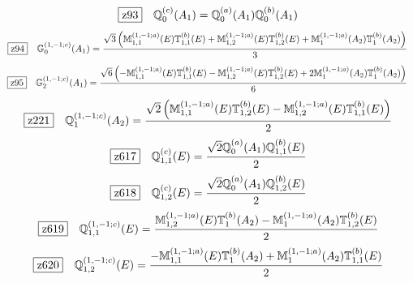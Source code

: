 \documentclass[fleqn,10pt,landscape]{jsarticle}
\begin{document}
\begin{dmath*}
\hspace*{3mm}\fbox{z93}\quad \mathbb{Q}_{0}^{(c)}(A_{1})=\mathbb{Q}_{0}^{(a)}(A_{1}) \mathbb{Q}_{0}^{(b)}(A_{1})
\end{dmath*}
\begin{dmath*}
\hspace*{3mm}\fbox{z94}\quad \mathbb{G}_{0}^{(1,-1;c)}(A_{1})=\frac{\sqrt{3} \left(\mathbb{M}_{1,1}^{(1,-1;a)}(E) \mathbb{T}_{1,1}^{(b)}(E) + \mathbb{M}_{1,2}^{(1,-1;a)}(E) \mathbb{T}_{1,2}^{(b)}(E) + \mathbb{M}_{1}^{(1,-1;a)}(A_{2}) \mathbb{T}_{1}^{(b)}(A_{2})\right)}{3}
\end{dmath*}
\begin{dmath*}
\hspace*{3mm}\fbox{z95}\quad \mathbb{G}_{2}^{(1,-1;c)}(A_{1})=\frac{\sqrt{6} \left(- \mathbb{M}_{1,1}^{(1,-1;a)}(E) \mathbb{T}_{1,1}^{(b)}(E) - \mathbb{M}_{1,2}^{(1,-1;a)}(E) \mathbb{T}_{1,2}^{(b)}(E) + 2 \mathbb{M}_{1}^{(1,-1;a)}(A_{2}) \mathbb{T}_{1}^{(b)}(A_{2})\right)}{6}
\end{dmath*}
\begin{dmath*}
\hspace*{3mm}\fbox{z221}\quad \mathbb{Q}_{1}^{(1,-1;c)}(A_{2})=\frac{\sqrt{2} \left(\mathbb{M}_{1,1}^{(1,-1;a)}(E) \mathbb{T}_{1,2}^{(b)}(E) - \mathbb{M}_{1,2}^{(1,-1;a)}(E) \mathbb{T}_{1,1}^{(b)}(E)\right)}{2}
\end{dmath*}
\begin{dmath*}
\hspace*{3mm}\fbox{z617}\quad \mathbb{Q}_{1,1}^{(c)}(E)=\frac{\sqrt{2} \mathbb{Q}_{0}^{(a)}(A_{1}) \mathbb{Q}_{1,1}^{(b)}(E)}{2}
\end{dmath*}
\begin{dmath*}
\hspace*{3mm}\fbox{z618}\quad \mathbb{Q}_{1,2}^{(c)}(E)=\frac{\sqrt{2} \mathbb{Q}_{0}^{(a)}(A_{1}) \mathbb{Q}_{1,2}^{(b)}(E)}{2}
\end{dmath*}
\begin{dmath*}
\hspace*{3mm}\fbox{z619}\quad \mathbb{Q}_{1,1}^{(1,-1;c)}(E)=\frac{\mathbb{M}_{1,2}^{(1,-1;a)}(E) \mathbb{T}_{1}^{(b)}(A_{2}) - \mathbb{M}_{1}^{(1,-1;a)}(A_{2}) \mathbb{T}_{1,2}^{(b)}(E)}{2}
\end{dmath*}
\begin{dmath*}
\hspace*{3mm}\fbox{z620}\quad \mathbb{Q}_{1,2}^{(1,-1;c)}(E)=\frac{- \mathbb{M}_{1,1}^{(1,-1;a)}(E) \mathbb{T}_{1}^{(b)}(A_{2}) + \mathbb{M}_{1}^{(1,-1;a)}(A_{2}) \mathbb{T}_{1,1}^{(b)}(E)}{2}
\end{dmath*}
\end{document}

